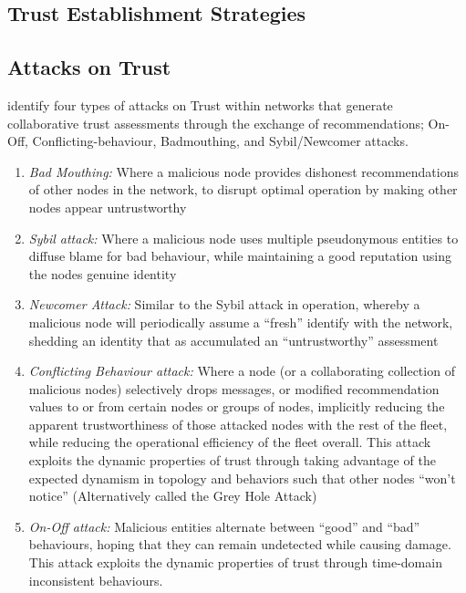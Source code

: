 \subsection{Trust Establishment Strategies}


\subsection{Attacks on Trust}

\citet{Liu2010} identify four types of attacks on Trust within networks that generate collaborative trust assessments through the exchange of recommendations; On-Off, Conflicting-behaviour, Badmouthing, and Sybil/Newcomer attacks.

\begin{enumerate}
	\item \emph{Bad Mouthing:} Where a malicious node provides dishonest recommendations of other nodes in the network, to disrupt optimal operation  by making other nodes appear untrustworthy
	\item \emph{Sybil attack:} Where a malicious node uses multiple pseudonymous entities to diffuse blame for bad behaviour, while maintaining a good reputation using the nodes genuine identity
	\item \emph{Newcomer Attack:} Similar to the Sybil attack in operation, whereby a malicious node will periodically assume a ``fresh'' identify with the network, shedding an identity that as accumulated an ``untrustworthy'' assessment
	\item \emph{Conflicting Behaviour attack:} Where a node (or a collaborating collection of malicious nodes) selectively drops messages, or modified recommendation values to or from certain nodes or groups of nodes, implicitly reducing the apparent trustworthiness of those attacked nodes with the rest of the fleet, while reducing the operational efficiency of the fleet overall.  This attack exploits the dynamic properties of trust through taking advantage of the expected dynamism in topology and behaviors such that other nodes ``won't notice'' (Alternatively called the Grey Hole Attack)
	\item \emph{On-Off attack:} Malicious entities alternate between ``good'' and ``bad'' behaviours, hoping that they can remain undetected while causing damage. This attack exploits the dynamic properties of trust through time-domain inconsistent behaviours.
\end{enumerate} 

